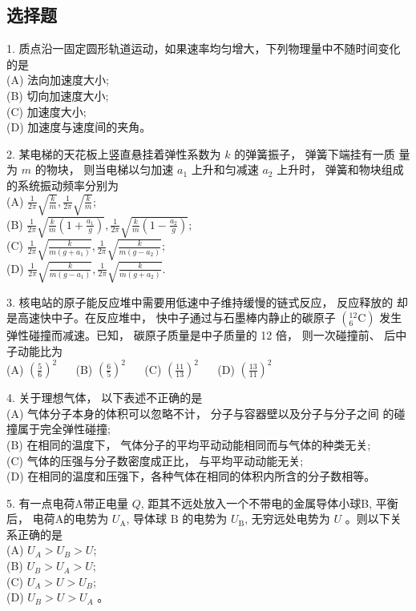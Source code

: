 \subsection{选择题}
1. 质点沿一固定圆形轨道运动，如果速率均匀增大，下列物理量中不随时间变化的是\\
(A) 法向加速度大小;\\
(B) 切向加速度大小;\\
(C) 加速度大小;\\
(D) 加速度与速度间的夹角。

2. 某电梯的天花板上竖直悬挂着弹性系数为 $k$ 的弹簧振子， 弹簧下端挂有一质 量为 $m$ 的物块， 则当电梯以匀加速 $a_{1}$ 上升和匀减速 $a_{2}$ 上升时， 弹簧和物块组成的系统振动频率分别为\\
(A) $\frac{1}{2 \pi} \sqrt{\frac{k}{m}},\frac{1}{2 \pi} \sqrt{\frac{k}{m}}$;\\
(B) $\frac{1}{2 \pi} \sqrt{\frac{k}{m}\left(1+\frac{a_{1}}{g}\right)},\frac{1}{2 \pi} \sqrt{\frac{k}{m}\left(1-\frac{a_{2}}{g}\right)} ;$\\
(C) $\frac{1}{2 \pi} \sqrt{\frac{k}{m\left(g+a_{1}\right)}},\frac{1}{2 \pi} \sqrt{\frac{k}{m\left(g-a_{2}\right)}} ;$\\
(D) $\frac{1}{2 \pi} \sqrt{\frac{k}{m\left(g-a_{1}\right)}},\frac{1}{2 \pi} \sqrt{\frac{k}{m\left(g+a_{2}\right)}} .$

3. 核电站的原子能反应堆中需要用低速中子维持缓慢的链式反应， 反应释放的 却是高速快中子。在反应堆中， 快中子通过与石墨棒内静止的碳原子 $\left({ }_{6}^{12} \mathrm{C}\right)$ 发生弹性碰撞而减速。已知， 碳原子质量是中子质量的 12 倍， 则一次碰撞前、 后中子动能比为\\
(A) $\left(\frac{5}{6}\right)^{2}$ $\quad$
(B) $\left(\frac{6}{5}\right)^{2}$ $\quad$
(C) $\left(\frac{11}{13}\right)^{2}$ $\quad$
(D) $\left(\frac{13}{11}\right)^{2}$ 

4. 关于理想气体， 以下表述不正确的是\\
(A) 气体分子本身的体积可以忽略不计， 分子与容器壁以及分子与分子之间 的碰撞属于完全弹性碰撞;\\
(B) 在相同的温度下， 气体分子的平均平动动能相同而与气体的种类无关;\\
(C) 气体的压强与分子数密度成正比， 与平均平动动能无关;\\
(D) 在相同的温度和压强下，各种气体在相同的体积内所含的分子数相等。

5. 有一点电荷A带正电量 $Q$, 距其不远处放入一个不带电的金属导体小球B, 平衡后， 电荷A的电势为 $U_{\mathrm{A}}$, 导体球 $\mathrm{B}$ 的电势为 $U_{\mathrm{B}}$, 无穷远处电势为 $U$ 。则以下关系正确的是\\
(A) $U_{A}>U_{B}>U$;\\
(B) $U_{B}>U_{A}>U$;\\
(C) $U_{A}>U>U_{B}$;\\
(D) $U_{B}>U>U_{A}$ 。


